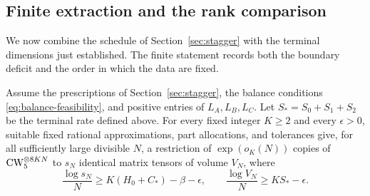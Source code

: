 \subsection{Finite extraction and the rank comparison}
\label{sec:staggered-assembly}

We now combine the schedule of Section~\ref{sec:stagger} with the
terminal dimensions just established.  The finite statement records
both the boundary deficit and the order in which the data are fixed.

\begin{proposition}\label{prop:staggered-yield}
Assume the prescriptions of Section~\ref{sec:stagger}, the balance
conditions \eqref{eq:balance-feasibility}, and positive entries of
$L_A,L_B,L_C$.  Let $S_*=S_0+S_1+S_2$ be the terminal rate defined above.
For every fixed integer $K\geq2$ and every $\epsilon>0$, suitable
fixed rational approximations, part allocations, and tolerances give,
for all sufficiently large divisible $N$, a restriction of
$\exp(o_K(N))$ copies of $\mathrm{CW}_5^{\otimes8KN}$ to $s_N$ identical
matrix tensors of volume $V_N$, where
\begin{equation}\label{eq:finite-stagger-yield}
 \frac{\log s_N}{N}\geq K(H_0+C_*)-\beta-\epsilon,
 \qquad
 \frac{\log V_N}{N}\geq KS_*-\epsilon.
\end{equation}
\end{proposition}

